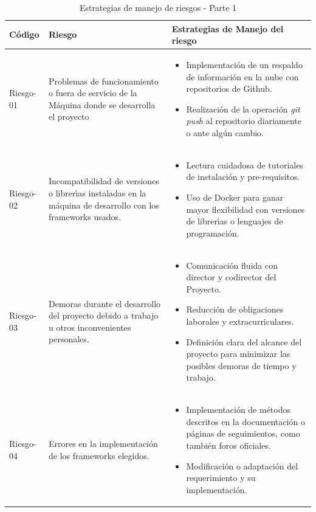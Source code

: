 \begin{table}[h!]
    \begin{tabular}{ | m{1.5cm} | m{5cm}| m{5cm} |}
        \hline
        \textbf{Código} & \textbf{Riesgo} & \textbf{Estrategias de Manejo del riesgo} \\
        \hline
        Riesgo-01 & Problemas de funcionamiento o fuera de servicio de la Máquina donde se desarrolla el proyecto  & \begin{itemize}
         \item Implementación de un respaldo de información en la nube con repositorios de Github.
            \item Realización de la operación \textit{git push} al repositorio diariamente o ante algún cambio. 
             \end{itemize}\\
        \hline
         Riesgo-02 & Incompatibilidad de versiones o librerı́as instaladas en la máquina de desarrollo con los frameworks usados.&  \begin{itemize}
         \item Lectura cuidadosa de tutoriales de instalación y pre-requisitos.     
         \item Uso de Docker para ganar mayor flexibilidad con versiones de librerı́as o lenguajes de programación. 
         \end{itemize} \\
        \hline
         Riesgo-03 & Demoras durante el desarrollo del proyecto debido a trabajo u otros inconvenientes personales.    
         & \begin{itemize} 
            \item Comunicación fluida con director y codirector del Proyecto.    
            \item Reducción de obligaciones laborales y extracurriculares. 
            \item Definición clara del alcance del proyecto para minimizar las posibles demoras de tiempo y trabajo.
          \end{itemize}\\
        \hline
        Riesgo-04 & Errores en la implementación de los frameworks elegidos.  &
        \begin{itemize} 
                    \item Implementación de métodos descritos en la documentación o páginas de seguimientos, como también foros oficiales.
                    \item Modificación o adaptación del requerimiento y su implementación.
                \end{itemize}\\
        \hline
    \end{tabular}\\
    \caption{Estrategias de manejo de riesgos - Parte 1}
    \label{manejoriesgos1}
\end{table}


